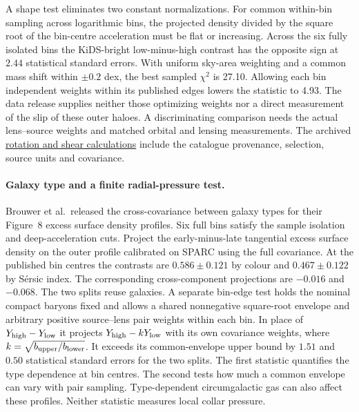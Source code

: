 \documentclass[11pt]{article}
\begin{document}
A shape test eliminates two constant normalizations. For common
within-bin sampling across logarithmic bins, the projected density
divided by the square root of the bin-centre acceleration must be flat
or increasing. Across the six fully isolated bins the KiDS-bright
low-minus-high contrast has the opposite sign at $2.44$ statistical
standard errors. With uniform sky-area weighting and a common mass
shift within $\pm0.2$ dex, the best sampled $\chi^2$ is 27.10.
Allowing each bin independent weights within its published edges
lowers the statistic to 4.93. The data release supplies neither those
optimizing weights nor a direct measurement of the slip of these
outer haloes. A discriminating comparison needs the actual
lens--source weights and matched orbital and lensing measurements.
The archived \href{https://github.com/FloatingPragma/observer-patch-holography/tree/main/code/cosmology/rar_deep_regime}{rotation and shear calculations} include the catalogue provenance,
selection, source units and covariance.

\paragraph{Galaxy type and a finite radial-pressure test.}
Brouwer et al.\ released the cross-covariance between galaxy types
for their Figure~8 excess surface density profiles. Six full bins satisfy
the sample isolation and deep-acceleration cuts. Project the early-minus-late
tangential excess surface density on the outer profile calibrated on SPARC
using the full covariance. At the published bin centres the contrasts
are $0.586\pm0.121$ by colour and $0.467\pm0.122$ by S\'ersic index.
The corresponding cross-component projections are $-0.016$ and $-0.068$.
The two splits reuse galaxies. A separate bin-edge test holds the nominal
compact baryons fixed and allows a shared nonnegative square-root envelope
and arbitrary positive source--lens pair weights within each bin. In
place of $Y_{\rm high}-Y_{\rm low}$ it projects
$Y_{\rm high}-kY_{\rm low}$ with its own covariance weights, where
$k=\sqrt{b_{\rm upper}/b_{\rm lower}}$. It exceeds its common-envelope
upper bound by $1.51$ and $0.50$ statistical standard errors for the two
splits. The first statistic quantifies the type dependence at bin centres.
The second tests how much a common envelope can vary with pair sampling.
Type-dependent circumgalactic gas can also affect these profiles.
Neither statistic measures local collar pressure.
\end{document}
